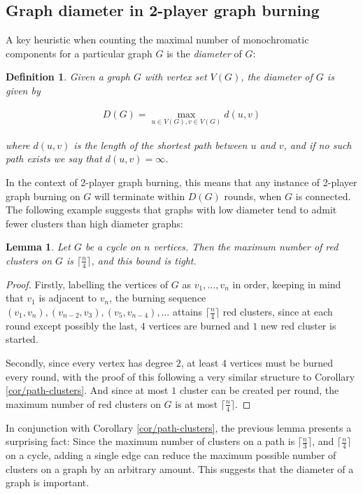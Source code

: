 \documentclass{mpaper}
\newtheorem{definition}[theorem]{Definition}
\newtheorem{lemma}[theorem]{Lemma}
\begin{document}
\subsection{Graph diameter in 2-player graph burning}

A key heuristic when counting the maximal number of monochromatic components for a particular graph $G$ is the \emph{diameter} of $G$:

\begin{definition}
\label{def/diameter}
  Given a graph $G$ with vertex set $V(G)$, the \emph{diameter} of $G$ is given by
  
  \begin{align*}
  D(G) = \max_{u \in V(G), v \in V(G)} d(u,v)
  \end{align*}

  where $d(u,v)$ is the length of the shortest path between $u$ and $v$, and if no such path exists we say that $d(u,v) = \infty$.
\end{definition}

In the context of 2-player graph burning, this means that any instance of 2-player graph burning on $G$ will terminate within $D(G)$ rounds, when $G$ is connected. The following example suggests that graphs with low diameter tend to admit fewer clusters than high diameter graphs:

\begin{lemma}
\label{lem/cycle-clusters}
  Let $G$ be a cycle on $n$ vertices. Then the maximum number of red clusters on $G$ is $\lceil \frac{n}{4} \rceil$, and this bound is tight.
\end{lemma}

\begin{proof}
  Firstly, labelling the vertices of $G$ as $v_1, \dots, v_n$ in order, keeping in mind that $v_1$ is adjacent to $v_n$, the burning sequence $(v_1, v_n), (v_{n-2}, v_3), (v_5, v_{n-4}), \dots$ attains $\lceil \frac{n}{4} \rceil$ red clusters, since at each round except possibly the last, $4$ vertices are burned and $1$ new red cluster is started.

  Secondly, since every vertex has degree $2$, at least $4$ vertices must be burned every round, with the proof of this following a very similar structure to Corollary \ref{cor/path-clusters}. And since at most $1$ cluster can be created per round, the maximum number of red clusters on $G$ is at most $\lceil \frac{n}{4} \rceil$.
\end{proof}

In conjunction with Corollary \ref{cor/path-clusters}, the previous lemma presents a surprising fact: Since the maximum number of clusters on a path is $\lceil \frac{n}{3} \rceil$, and $\lceil \frac{n}{4}\rceil$ on a cycle, adding a single edge can reduce the maximum possible number of clusters on a graph by an arbitrary amount. This suggests that the diameter of a graph is important.
\end{document}
